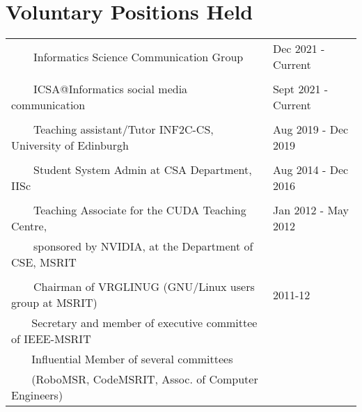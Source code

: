\documentclass[a4paper,10pt]{article} %
\newcommand{\tabitem}{~~\llap{\textbullet}~~}
\begin{document}
\section{Voluntary Positions Held}
\hskip-0.4cm
\begin{tabular}{ll}
	\tabitem Informatics Science Communication Group & Dec 2021 - Current \\
	&\\
	\tabitem ICSA@Informatics social media communication & Sept 2021 - Current \\
	& \\
	\tabitem Teaching assistant/Tutor INF2C-CS, University of Edinburgh & Aug 2019 - Dec 2019 \\
	& \\
	\tabitem Student System Admin at CSA Department, IISc & Aug 2014 - Dec 2016 \\
	&\\
	\tabitem Teaching Associate for the CUDA Teaching Centre,  & Jan 2012 - May 2012\\
	~~~~sponsored by NVIDIA, at the Department of CSE, MSRIT &  \\
	&\\
	\tabitem Chairman of VRGLINUG (GNU/Linux users group at MSRIT) & 2011-12 \\
	~~~ Secretary and member of executive committee of IEEE-MSRIT &  \\
	~~~ Influential Member of several committees & \\
	~~~ {\footnotesize (RoboMSR, CodeMSRIT, Assoc. of Computer Engineers)} & \\
\end{tabular}

\end{document}

